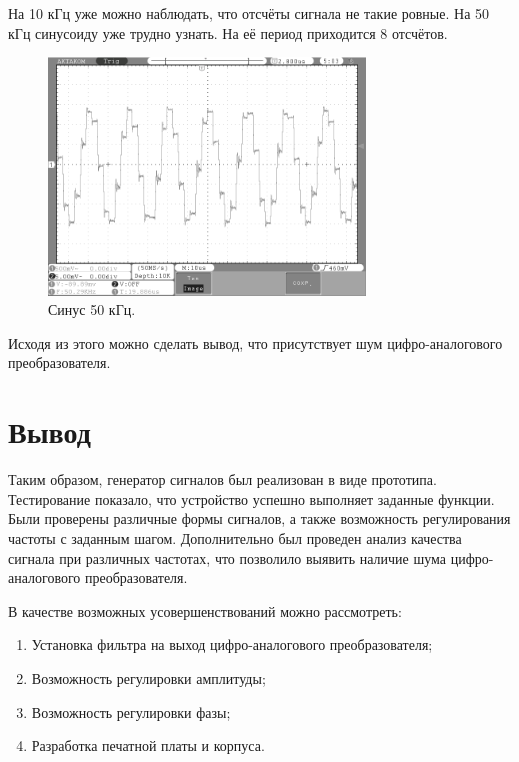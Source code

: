 	На 10 кГц уже можно наблюдать, что отсчёты сигнала не такие ровные. На 50 кГц синусоиду уже трудно узнать. На её период приходится 8 отсчётов.
	
	\begin{figure}[H]
    \centering
    \includegraphics[width=0.75\textwidth]{../image/sin50.bmp}
    \caption{Синус 50 кГц.}
	\end{figure}	
	
	Исходя из этого можно сделать вывод, что присутствует шум цифро-аналогового преобразователя. 

\section{Вывод}
	Таким образом, генератор сигналов был реализован в виде прототипа. Тестирование показало, что устройство успешно выполняет заданные функции. Были проверены различные формы сигналов, а также возможность регулирования частоты с заданным шагом. Дополнительно был проведен анализ качества сигнала при различных частотах, что позволило выявить наличие шума цифро-аналогового преобразователя. 
	
	В качестве возможных усовершенствований можно рассмотреть:
	\begin{enumerate}
	\item Установка фильтра на выход цифро-аналогового преобразователя;
	\item Возможность регулировки амплитуды;
	\item Возможность регулировки фазы;
	\item Разработка печатной платы и корпуса.
	\end{enumerate}